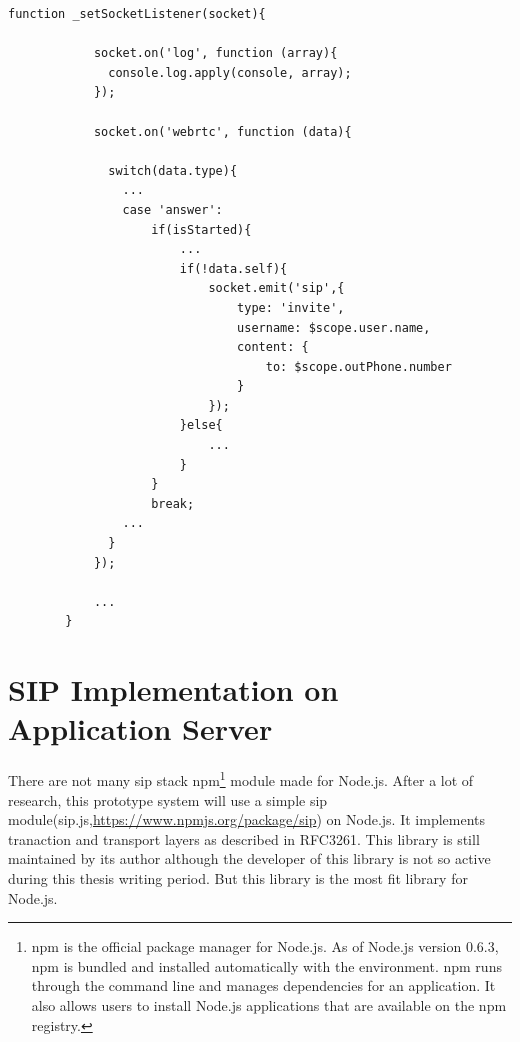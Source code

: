 \begin{lstlisting}[caption={\_setSocketListener() Function in PhoneViewCtrl.js on Application Client},label={code:client_socket}]
function _setSocketListener(socket){

			socket.on('log', function (array){
			  console.log.apply(console, array);
			});

			socket.on('webrtc', function (data){
			  
			  switch(data.type){
			  	...
			  	case 'answer':
			  		if(isStarted){
			  			...
			  			if(!data.self){
			  				socket.emit('sip',{
						    	type: 'invite',
						    	username: $scope.user.name,
						    	content: {
						    		to: $scope.outPhone.number
						    	}
						    });
			  			}else{
			  				...
			  			}
			  		}
			  		break;
			  	...
			  }
			});

			...
		}

\end{lstlisting}


\section{SIP Implementation on Application Server}

\noindent There are not many \gls{sip} stack \gls{npm}\footnote{npm is the official package manager for Node.js. As of Node.js version 0.6.3, npm is bundled and installed automatically with the environment. npm runs through the command line and manages dependencies for an application. It also allows users to install Node.js applications that are available on the npm registry.\cite{wiki:npm}} module made for Node.js. After a lot of research, this prototype system will use a simple \gls{sip} module(sip.js,\url{https://www.npmjs.org/package/sip}) on Node.js. It implements tranaction and transport layers as described in RFC3261. This library is still maintained by its author although the developer of this library is not so active during this thesis writing period. But this library is the most fit library for Node.js.

